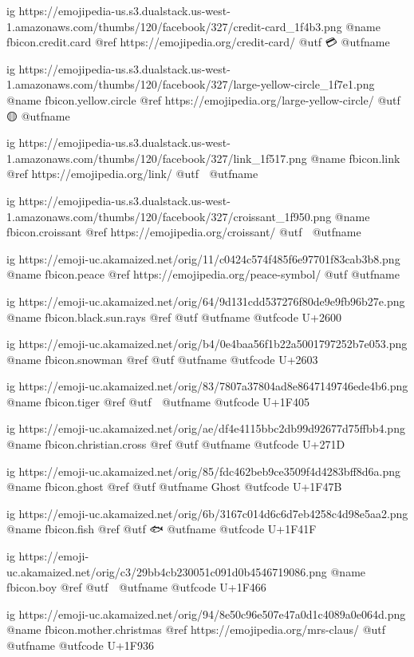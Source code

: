 	ig https://emojipedia-us.s3.dualstack.us-west-1.amazonaws.com/thumbs/120/facebook/327/credit-card_1f4b3.png
	@name fbicon.credit.card
	@ref https://emojipedia.org/credit-card/
	@utf 💳
	@utfname

	ig https://emojipedia-us.s3.dualstack.us-west-1.amazonaws.com/thumbs/120/facebook/327/large-yellow-circle_1f7e1.png
	@name fbicon.yellow.circle
	@ref https://emojipedia.org/large-yellow-circle/
	@utf 🟡
	@utfname

	ig https://emojipedia-us.s3.dualstack.us-west-1.amazonaws.com/thumbs/120/facebook/327/link_1f517.png
	@name fbicon.link
	@ref https://emojipedia.org/link/
	@utf 🔗
	@utfname

	ig https://emojipedia-us.s3.dualstack.us-west-1.amazonaws.com/thumbs/120/facebook/327/croissant_1f950.png
	@name fbicon.croissant
	@ref https://emojipedia.org/croissant/
	@utf 🥐
	@utfname

	ig https://emoji-uc.akamaized.net/orig/11/c0424c574f485f6e97701f83cab3b8.png
	@name fbicon.peace
	@ref https://emojipedia.org/peace-symbol/
	@utf
	@utfname

	ig https://emoji-uc.akamaized.net/orig/64/9d131cdd537276f80de9e9fb96b27e.png
	@name fbicon.black.sun.rays
	@ref
	@utf
	@utfname
	@utfcode U+2600

	ig https://emoji-uc.akamaized.net/orig/b4/0e4baa56f1b22a5001797252b7e053.png
	@name fbicon.snowman
	@ref
	@utf
	@utfname
	@utfcode U+2603

	ig https://emoji-uc.akamaized.net/orig/83/7807a37804ad8e8647149746ede4b6.png
	@name fbicon.tiger
	@ref
	@utf 🐅
	@utfname
	@utfcode U+1F405

	ig https://emoji-uc.akamaized.net/orig/ae/df4e4115bbc2db99d92677d75ffbb4.png
	@name fbicon.christian.cross
	@ref
	@utf
	@utfname
	@utfcode U+271D

	ig https://emoji-uc.akamaized.net/orig/85/fdc462beb9ce3509f4d4283bff8d6a.png
	@name fbicon.ghost
	@ref
	@utf
	@utfname Ghost
	@utfcode U+1F47B

	ig https://emoji-uc.akamaized.net/orig/6b/3167c014d6c6d7eb4258c4d98e5aa2.png
	@name fbicon.fish
	@ref
	@utf 🐟
	@utfname
	@utfcode U+1F41F

	ig https://emoji-uc.akamaized.net/orig/c3/29bb4cb230051c091d0b4546719086.png
	@name fbicon.boy
	@ref
	@utf 👦
	@utfname
	@utfcode U+1F466

	ig https://emoji-uc.akamaized.net/orig/94/8e50c96e507e47a0d1c4089a0e064d.png
	@name fbicon.mother.christmas
	@ref https://emojipedia.org/mrs-claus/
	@utf 🤶
	@utfname
	@utfcode U+1F936

\fi

